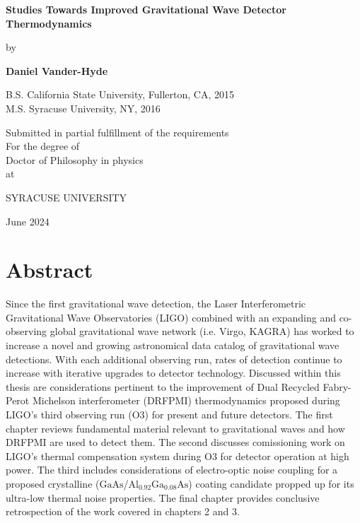 \documentclass[12pt]{report}
\newcommand{\algaas}{\mathrm{Al_{0.92}Ga_{0.08}As}}
\newcommand{\gaas}{\mathrm{GaAs}}
\begin{document}
\begin{titlepage}
\begin{center}
       \vspace*{1cm}

       \textbf{\LARGE Studies Towards Improved Gravitational Wave Detector Thermodynamics}

       \vspace{0.5cm}
       {\large by}
            
       \vspace{0.5cm}

       \textbf{\large Daniel Vander-Hyde}


       \vspace{0.5cm}
       {\large B.S. California State University, Fullerton, CA, 2015}
       \\
       {\large M.S. Syracuse University, NY, 2016}
       
       \vspace{1.0cm}
             
       {\large Submitted in partial fulfillment of the requirements\\
       For the degree of \\
       Doctor of Philosophy in physics\\
       at}

       \vspace{0.5cm}

       {\large \uppercase{Syracuse University}}
       \vfill
     
       June 2024
            
   \end{center}
\end{titlepage}

\chapter*{Abstract}
Since the first gravitational wave detection, the Laser Interferometric Gravitational Wave Observatories (LIGO) combined with an expanding and co-observing global gravitational wave network (i.e. Virgo, KAGRA) has worked to increase a novel and growing astronomical data catalog of gravitational wave detections. With each additional observing run, rates of detection continue to increase with iterative upgrades to detector technology. Discussed within this thesis are considerations pertinent to the improvement of Dual Recycled Fabry-Perot Michelson interferometer (DRFPMI) thermodynamics proposed during LIGO's third observing run (O3) for present and future detectors. The first chapter reviews fundamental material relevant to gravitational waves and how DRFPMI are used to detect them. The second discusses comissioning work on LIGO's thermal compensation system during O3 for detector operation at high power. The third includes considerations of electro-optic noise coupling for a proposed crystalline ($\gaas$/$\algaas$) coating candidate propped up for its ultra-low thermal noise properties. The final chapter provides conclusive retrospection of the work covered in chapters 2 and 3.  
\end{document}
